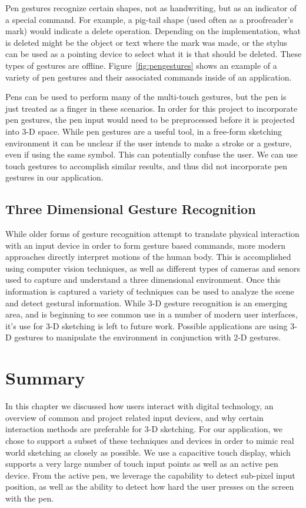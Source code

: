 Pen gestures recognize certain shapes, not as handwriting, but as an indicator of a special command.
For example, a pig-tail shape (used often as a proofreader's mark) would indicate a delete operation. 
Depending on the implementation, what is deleted might be the object or text where the mark was made, or the stylus can be used as a pointing device to select what it is that should be deleted.
These types of gestures are offline.
Figure~\ref{fig:pengestures} shows an example of a variety of pen gestures and their associated commands inside of an application.

Pens can be used to perform many of the multi-touch gestures, but the pen is just treated as a finger in these scenarios.
In order for this project to incorporate pen gestures, the pen input would need to be preprocessed before it is projected into 3-D space.
While pen gestures are a useful tool, in a free-form sketching environment it can be unclear if the user intends to make a stroke or a gesture, even if using the same symbol.
This can potentially confuse the user.
We can use touch gestures to accomplish similar results, and thus did not incorporate pen gestures in our application.




\subsection{Three Dimensional Gesture Recognition}

While older forms of gesture recognition attempt to translate physical interaction with an input device in order to form gesture based commands, more modern approaches directly interpret motions of the human body.
This is accomplished using computer vision techniques, as well as different types of cameras and senors used to capture and understand a three dimensional environment.
Once this information is captured a variety of techniques can be used to analyze the scene and detect gestural information. 
While 3-D gesture recognition is an emerging area, and is beginning to see common use in a number of modern user interfaces, it's use for 3-D sketching is left to future work.
Possible applications are using 3-D gestures to manipulate the environment in conjunction with 2-D gestures.

\section{Summary}
In this chapter we discussed how users interact with digital technology, an overview of common and project related input devices, and why certain interaction methods are preferable for 3-D sketching.
For our application, we chose to support a subset of these techniques and devices in order to mimic real world sketching as closely as possible.
We use a capacitive touch display, which supports a very large number of touch input points as well as an active pen device.
From the active pen, we leverage the capability to detect sub-pixel input position, as well as the ability to detect how hard the user presses on the screen with the pen.